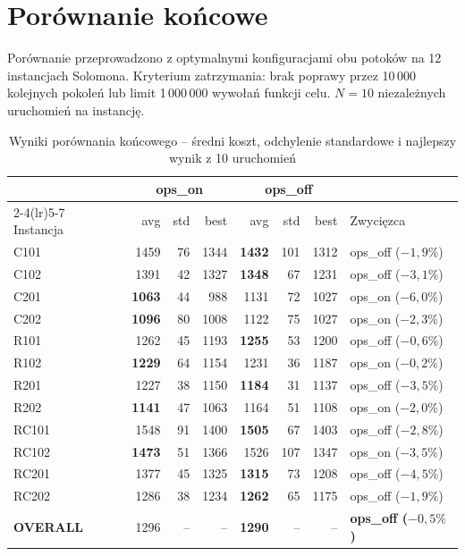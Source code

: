 \documentclass[11pt,a4paper]{article}
\begin{document}
\section{Porównanie końcowe}
\label{sec:final}

Porównanie przeprowadzono z optymalnymi konfiguracjami obu potoków na 12
instancjach Solomona. Kryterium zatrzymania: brak poprawy przez 10\,000
kolejnych pokoleń lub limit 1\,000\,000 wywołań funkcji celu.
$N=10$ niezależnych uruchomień na instancję.

\begin{table}[H]
\centering
\caption{Wyniki porównania końcowego -- średni koszt, odchylenie standardowe i najlepszy wynik z 10 uruchomień}
\begin{tabular}{lrrrrrrl}
\toprule
 & \multicolumn{3}{c}{ops\_on} & \multicolumn{3}{c}{ops\_off} & \\
\cmidrule(lr){2-4}\cmidrule(lr){5-7}
Instancja & avg & std & best & avg & std & best & Zwycięzca \\
\midrule
C101  & 1459 & 76  & 1344 & \textbf{1432} & 101 & 1312 & ops\_off ($-1{,}9\%$) \\
C102  & 1391 & 42  & 1327 & \textbf{1348} & 67  & 1231 & ops\_off ($-3{,}1\%$) \\
C201  & \textbf{1063} & 44  & 988  & 1131 & 72  & 1027 & ops\_on ($-6{,}0\%$) \\
C202  & \textbf{1096} & 80  & 1008 & 1122 & 75  & 1027 & ops\_on ($-2{,}3\%$) \\
R101  & 1262 & 45  & 1193 & \textbf{1255} & 53  & 1200 & ops\_off ($-0{,}6\%$) \\
R102  & \textbf{1229} & 64  & 1154 & 1231 & 36  & 1187 & ops\_on ($-0{,}2\%$) \\
R201  & 1227 & 38  & 1150 & \textbf{1184} & 31  & 1137 & ops\_off ($-3{,}5\%$) \\
R202  & \textbf{1141} & 47  & 1063 & 1164 & 51  & 1108 & ops\_on ($-2{,}0\%$) \\
RC101 & 1548 & 91  & 1400 & \textbf{1505} & 67  & 1403 & ops\_off ($-2{,}8\%$) \\
RC102 & \textbf{1473} & 51  & 1366 & 1526 & 107 & 1347 & ops\_on ($-3{,}5\%$) \\
RC201 & 1377 & 45  & 1325 & \textbf{1315} & 73  & 1208 & ops\_off ($-4{,}5\%$) \\
RC202 & 1286 & 38  & 1234 & \textbf{1262} & 65  & 1175 & ops\_off ($-1{,}9\%$) \\
\midrule
\textbf{OVERALL} & 1296 & -- & -- & \textbf{1290} & -- & -- & \textbf{ops\_off ($-0{,}5\%$)} \\
\bottomrule
\end{tabular}
\end{table}
\end{document}
